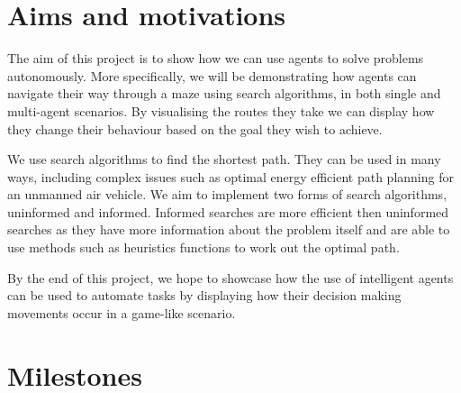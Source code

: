 \documentclass[]{final_report}
\begin{document}
\section{Aims and motivations}

The aim of this project is to show how we can use agents to solve problems autonomously. More specifically, we will be demonstrating how agents can navigate their way through a maze using search algorithms, in both single and multi-agent scenarios. By visualising the routes they take we can display how they change their behaviour based on the goal they wish to achieve. 

We use search algorithms to find the shortest path. They can be used in many ways, including complex issues such as optimal energy efficient path planning for an unmanned air vehicle\cite{debnath2019review}. We aim to implement two forms of search algorithms, uninformed and informed. Informed searches are more efficient then uninformed searches as they have more information about the problem itself and are able to use methods such as heuristics functions to work out the optimal path. 

By the end of this project, we hope to showcase how the use of intelligent agents can be used to automate tasks by displaying how their decision making movements occur in a game-like scenario. 
\newpage
\section{Milestones}
\end{document}

